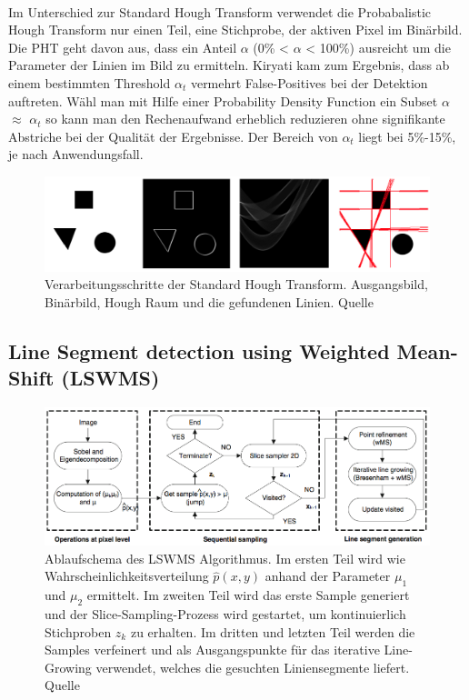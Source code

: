 \paragraph{}
Im Unterschied zur Standard Hough Transform verwendet die Probabalistic Hough Transform nur einen Teil, eine Stichprobe, der aktiven Pixel im Binärbild. Die PHT geht davon aus, dass ein Anteil $\alpha$ (0\% < $\alpha$ < 100\%) ausreicht um die Parameter der Linien im Bild zu ermitteln. Kiryati kam zum Ergebnis, dass ab einem bestimmten Threshold $\alpha_t$ vermehrt False-Positives bei der Detektion auftreten. Wähl man mit Hilfe einer Probability Density Function ein Subset $\alpha$ $\approx$ $\alpha_t$ so kann man den Rechenaufwand erheblich reduzieren ohne signifikante Abstriche bei der Qualität der Ergebnisse. Der Bereich von $\alpha_t$ liegt bei 5\%-15\%, je nach Anwendungsfall.

\begin{figure}[!ht]
\centering
\includegraphics[scale=0.25]{images/hough-transform} 
\caption{Verarbeitungsschritte der Standard Hough Transform. Ausgangsbild, Binärbild, Hough Raum und die gefundenen Linien. Quelle \cite{kiryati}}
\label{fig:hough-transform}
\end{figure}

\pagebreak

\subsection{Line Segment detection using Weighted Mean-Shift (LSWMS)}

\begin{figure}[!ht]
\centering
\includegraphics[scale=0.4]{images/lswms} 
\caption{Ablaufschema des LSWMS Algorithmus. Im ersten Teil wird wie Wahrscheinlichkeitsverteilung $\hat{p}(x,y)$ anhand der Parameter $\mu_1$ und $\mu_2$ ermittelt. Im zweiten Teil wird das erste Sample generiert und der Slice-Sampling-Prozess wird gestartet, um kontinuierlich Stichproben $z_k$ zu erhalten. Im dritten und letzten Teil werden die Samples verfeinert und als Ausgangspunkte für das iterative Line-Growing verwendet, welches die gesuchten Liniensegmente liefert. Quelle \cite{nieto}}
\label{fig:lswms}
\end{figure}

